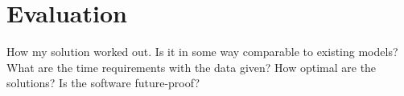 \chapter{Evaluation}
\label{chapter:evaluation}

How my solution worked out. Is it in some way comparable to existing models?
What are the time requirements with the data given? How optimal are the
solutions? Is the software future-proof?
